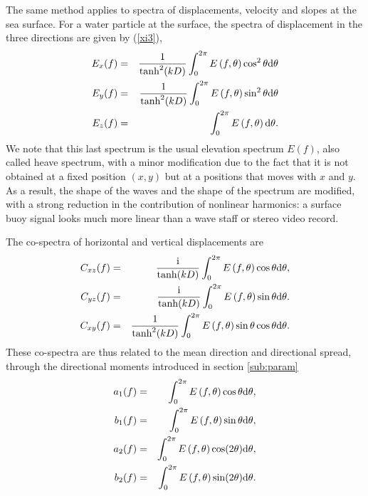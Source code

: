 The same method applies to spectra of displacements, velocity and slopes at the sea surface. 
For a water particle at the surface, the spectra of displacement in the three directions are given by  (\ref{xi3}),
\begin{eqnarray}
    E_{x} ( f)  & = &  \frac{1}{\tanh^2(kD)} \int_0^{2 \pi} E\left( f,\theta \right)\cos^2 \theta {\mathrm
    d}\theta \\
    E_{y} ( f)  & = &  \frac{1}{\tanh^2(kD)} \int_0^{2 \pi} E\left( f,\theta \right)\sin^2 \theta {\mathrm
    d}\theta \\
   E_{z} ( f)  & = &  \int_0^{2 \pi} E\left( f,\theta \right) {\mathrm
    d}\theta.
\end{eqnarray}
We note that this last spectrum is the usual elevation spectrum $E(f)$, also called heave spectrum, with a minor modification due to the fact that it is not 
obtained at a fixed position $(x,y)$ but at a positions that moves with $x$ and $y$. As a result, the shape of the waves and the shape of the spectrum are modified, with a strong reduction in the contribution of nonlinear harmonics: a surface buoy signal looks much more linear than a wave staff or stereo video record. 

The co-spectra of horizontal and vertical displacements are 
\begin{eqnarray}
    C_{xz} ( f)  & = &  \frac{\mathrm i}{\tanh(kD)} \int_0^{2 \pi} E\left( f,\theta \right)\cos \theta {\mathrm
    d}\theta, \label{Exz}\\
    C_{yz} ( f)  & = &  \frac{\mathrm i}{\tanh(kD)} \int_0^{2 \pi} E\left( f,\theta \right)\sin \theta {\mathrm
    d}\theta .\label{Eyz} \\
    C_{xy} ( f)  & = &  \frac{1}{\tanh^2(kD)} \int_0^{2 \pi} E\left( f,\theta \right)\sin \theta \cos \theta {\mathrm
    d}\theta .\label{Exy}
\end{eqnarray}
These co-spectra are thus related to the mean direction and directional spread, through the directional moments introduced in section  \ref{sub:param}
\begin{eqnarray}
    a_1 ( f)  & = &  \int_0^{2 \pi} E\left( f,\theta \right)\cos \theta {\mathrm
    d}\theta, \\
    b_1 ( f)  & = &   \int_0^{2 \pi} E\left( f,\theta \right)\sin \theta {\mathrm
    d}\theta,  \\
    a_2 ( f)  & = &  \int_0^{2 \pi} E\left( f,\theta \right)\cos (2\theta) {\mathrm
    d}\theta, \\
    b_2 ( f)  & = &   \int_0^{2 \pi} E\left( f,\theta \right)\sin (2 \theta) {\mathrm
    d}\theta.
\end{eqnarray}


